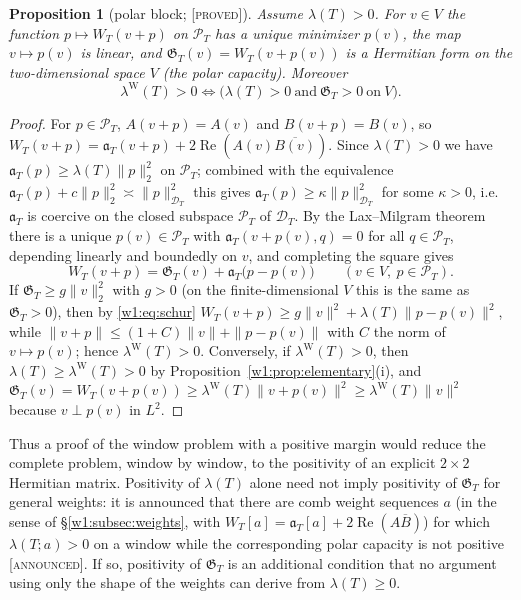 \documentclass[11pt]{amsart}
\newtheorem{proposition}[theorem]{Proposition}
\theoremstyle{definition}
\theoremstyle{remark}
\numberwithin{equation}{section}
\DeclareMathOperator{\Rel}{Re}
\newcommand{\PT}{\mathcal{P}_T}                        %
\newcommand{\DT}{\mathcal{D}_T}                        %
\newcommand{\aT}{\mathfrak{a}_T}                       %
\newcommand{\WT}{W_T}                                  %
\newcommand{\lam}{\lambda(T)}                          %
\newcommand{\lamW}{\lambda^{\mathrm W}(T)}             %
\newcommand{\stag}[1]{\textsc{[#1]}}
\newcommand{\PROVED}{\stag{proved}}
\newcommand{\ANNOUNCED}{\stag{announced}}
\begin{document}
\begin{proposition}[polar block; \PROVED]\label{w1:prop:polar}
Assume $\lam>0$. For $v\in V$ the function $p\mapsto\WT(v+p)$ on $\PT$ has a
unique minimizer $p(v)$, the map $v\mapsto p(v)$ is linear, and
$\mathfrak G_T(v)=\WT(v+p(v))$ is a Hermitian form on the two-dimensional
space $V$ (the \emph{polar capacity}). Moreover
\[
  \lamW>0\iff\bigl(\lam>0\ \text{and}\ \mathfrak G_T>0\ \text{on}\ V\bigr).
\]
\end{proposition}

\begin{proof}
For $p\in\PT$, $A(v+p)=A(v)$ and $B(v+p)=B(v)$, so
$\WT(v+p)=\aT(v+p)+2\Rel(A(v)\overline{B(v)})$. Since $\lam>0$ we have
$\aT(p)\ge\lam\|p\|_2^2$ on $\PT$; combined with the equivalence
$\aT(p)+c\|p\|_2^2\asymp\|p\|_{\DT}^2$ this gives
$\aT(p)\ge\kappa\|p\|_{\DT}^2$ for some $\kappa>0$, i.e.\ $\aT$ is coercive on
the closed subspace $\PT$ of $\DT$. By the Lax--Milgram theorem there is a
unique $p(v)\in\PT$ with $\aT(v+p(v),q)=0$ for all $q\in\PT$, depending
linearly and boundedly on $v$, and completing the square gives
\begin{equation}\label{w1:eq:schur}
  \WT(v+p)=\mathfrak G_T(v)+\aT\bigl(p-p(v)\bigr)\qquad(v\in V,\ p\in\PT).
\end{equation}
If $\mathfrak G_T\ge g\|v\|_2^2$ with $g>0$ (on the finite-dimensional $V$
this is the same as $\mathfrak G_T>0$), then by \eqref{w1:eq:schur}
$\WT(v+p)\ge g\|v\|^2+\lam\|p-p(v)\|^2$, while
$\|v+p\|\le(1+C)\|v\|+\|p-p(v)\|$ with $C$ the norm of $v\mapsto p(v)$; hence
$\lamW>0$. Conversely, if $\lamW>0$, then $\lam\ge\lamW>0$ by
Proposition~\ref{w1:prop:elementary}(i), and
$\mathfrak G_T(v)=\WT(v+p(v))\ge\lamW\|v+p(v)\|^2\ge\lamW\|v\|^2$ because
$v\perp p(v)$ in $L^2$.
\end{proof}

Thus a proof of the window problem with a positive margin would reduce the
complete problem, window by window, to the positivity of an explicit
$2\times2$ Hermitian matrix. Positivity of $\lam$ alone need not imply
positivity of $\mathfrak G_T$ for general weights: it is announced that there
are comb weight sequences $a$ (in the sense of \S\ref{w1:subsec:weights},
with $W_T[a]=\aT[a]+2\Rel(A\overline B)$) for which $\lambda(T;a)>0$ on a
window while the corresponding polar capacity is not positive \ANNOUNCED. If so, positivity of
$\mathfrak G_T$ is an additional condition that no argument using only the
shape of the weights can derive from $\lam\ge0$.
\end{document}
